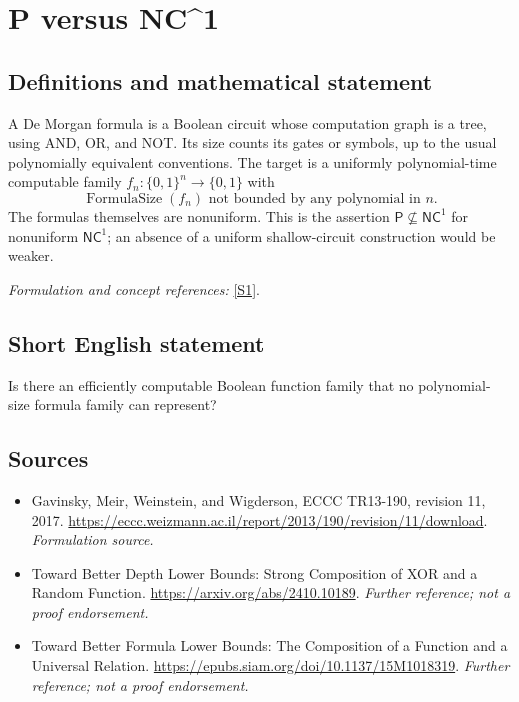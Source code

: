 \documentclass[11pt]{article}
\begin{document}
\section*{\texorpdfstring{P versus NC\textasciicircum{}1}{P versus NC\textasciicircum{}1}}\label{69}
\subsection{Definitions and mathematical statement}
A De Morgan formula is a Boolean circuit whose computation graph is a tree, using AND, OR, and NOT. Its size counts its gates or symbols, up to the usual polynomially equivalent conventions. The target is a uniformly polynomial-time computable family $f_n:\{0,1\}^n\to\{0,1\}$ with
\[
 \operatorname{FormulaSize}(f_n)\text{ not bounded by any polynomial in }n.
\]
The formulas themselves are nonuniform. This is the assertion $\mathsf P\nsubseteq\mathsf{NC}^1$ for nonuniform $\mathsf{NC}^1$; an absence of a uniform shallow-circuit construction would be weaker.
\par\smallskip\textit{Formulation and concept references:} \href{https://eccc.weizmann.ac.il/report/2013/190/revision/11/download}{[S1]}.

\subsection{Short English statement}
Is there an efficiently computable Boolean function family that no polynomial-size formula family can represent?
\subsection{Sources}
\begin{itemize}
\item[S1]Gavinsky, Meir, Weinstein, and Wigderson, ECCC TR13-190, revision 11, 2017.
\url{https://eccc.weizmann.ac.il/report/2013/190/revision/11/download}.
\textit{Formulation source.}
\item[S2]Toward Better Depth Lower Bounds: Strong Composition of XOR and a Random Function.
\url{https://arxiv.org/abs/2410.10189}.
\textit{Further reference; not a proof endorsement.}
\item[S3]Toward Better Formula Lower Bounds: The Composition of a Function and a Universal Relation.
\url{https://epubs.siam.org/doi/10.1137/15M1018319}.
\textit{Further reference; not a proof endorsement.}
\end{itemize}
\end{document}
